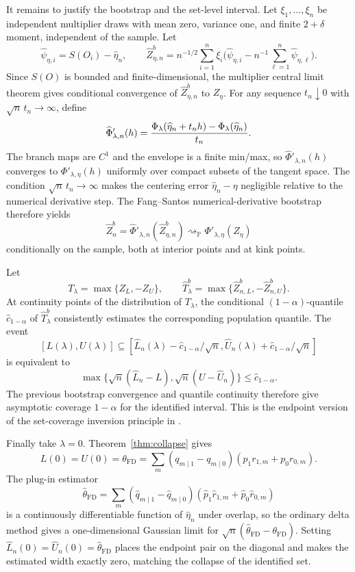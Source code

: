 \documentclass[11pt]{article}
\renewcommand{\Pr}{\mathbb{P}}
\theoremstyle{definition}
\theoremstyle{plain}
\theoremstyle{remark}
\begin{document}
It remains to justify the bootstrap and the set-level interval.  Let
\(\xi_1,\ldots,\xi_n\) be independent multiplier draws with mean zero, variance one,
and finite \(2+\delta\) moment, independent of the sample.  Let
\[
  \widehat\psi_{\eta,i}=S(O_i)-\widehat\eta_n,\qquad
  \widehat Z_{\eta,n}^b
  =
  n^{-1/2}\sum_{i=1}^n\xi_i
  \bigl(\widehat\psi_{\eta,i}-n^{-1}\sum_{\ell=1}^n\widehat\psi_{\eta,\ell}\bigr).
\]
Since \(S(O)\) is bounded and finite-dimensional, the multiplier central limit theorem
gives conditional convergence of \(\widehat Z_{\eta,n}^b\) to \(Z_\eta\).  For any
sequence \(t_n\downarrow0\) with \(\sqrt n\,t_n\to\infty\), define
\[
  \widehat\Phi'_{\lambda,n}(h)
  =
  { \Phi_\lambda(\widehat\eta_n+t_nh)-\Phi_\lambda(\widehat\eta_n)\over t_n}.
\]
The branch maps are \(C^1\) and the envelope is a finite min/max, so
\(\widehat\Phi'_{\lambda,n}(h)\) converges to
\(\Phi'_{\lambda,\eta}(h)\) uniformly over compact subsets of the tangent space.  The
condition \(\sqrt n\,t_n\to\infty\) makes the centering error
\(\widehat\eta_n-\eta\) negligible relative to the numerical derivative step.  The
Fang--Santos numerical-derivative bootstrap therefore yields
\[
  \widehat Z_n^b
  =
  \widehat\Phi'_{\lambda,n}(\widehat Z_{\eta,n}^b)
  \rightsquigarrow_{\Pr}
  \Phi'_{\lambda,\eta}(Z_\eta)
\]
conditionally on the sample, both at interior points and at kink points.

Let
\[
  T_\lambda
  =
  \max\{Z_L,-Z_U\},
  \qquad
  \widehat T_\lambda^b
  =
  \max\{\widehat Z_{n,L}^b,-\widehat Z_{n,U}^b\}.
\]
At continuity points of the distribution of \(T_\lambda\), the conditional
\((1-\alpha)\)-quantile \(\widehat c_{1-\alpha}\) of
\(\widehat T_\lambda^b\) consistently estimates the corresponding population
quantile.  The event
\[
  [L(\lambda),U(\lambda)]
  \subseteq
  [\widehat L_n(\lambda)-\widehat c_{1-\alpha}/\sqrt n,
   \widehat U_n(\lambda)+\widehat c_{1-\alpha}/\sqrt n]
\]
is equivalent to
\[
  \max\{\sqrt n(\widehat L_n-L),\sqrt n(U-\widehat U_n)\}
  \le \widehat c_{1-\alpha}.
\]
The previous bootstrap convergence and quantile continuity therefore give asymptotic
coverage \(1-\alpha\) for the identified interval.  This is the endpoint version of
the set-coverage inversion principle in
\citet{ChernozhukovHongTamer2007ParameterSets}.

Finally take \(\lambda=0\).  Theorem~\ref{thm:collapse} gives
\[
  L(0)=U(0)=\theta_{\mathrm{FD}}
  =
  \sum_m(q_{m\mid1}-q_{m\mid0})(p_1r_{1,m}+p_0r_{0,m}).
\]
The plug-in estimator
\[
  \widehat\theta_{\mathrm{FD}}
  =
  \sum_m(\widehat q_{m\mid1}-\widehat q_{m\mid0})
        (\widehat p_1\widehat r_{1,m}+\widehat p_0\widehat r_{0,m})
\]
is a continuously differentiable function of \(\widehat\eta_n\) under overlap, so the
ordinary delta method gives a one-dimensional Gaussian limit for
\(\sqrt n(\widehat\theta_{\mathrm{FD}}-\theta_{\mathrm{FD}})\).  Setting
\(\widehat L_n(0)=\widehat U_n(0)=\widehat\theta_{\mathrm{FD}}\) places the endpoint
pair on the diagonal and makes the estimated width exactly zero, matching the collapse
of the identified set.
\end{document}
